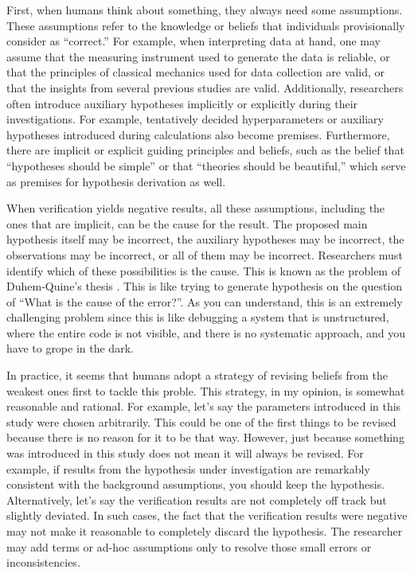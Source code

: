 \documentclass{article}
\begin{document}
First, when humans think about something, they always need some assumptions. These assumptions refer to the knowledge or beliefs that individuals provisionally consider as ``correct.'' For example, when interpreting data at hand, one may assume that the measuring instrument used to generate the data is reliable, or that the principles of classical mechanics used for data collection are valid, or that the insights from several previous studies are valid. Additionally, researchers often introduce auxiliary hypotheses implicitly or explicitly during their investigations. For example, tentatively decided hyperparameters or auxiliary hypotheses introduced during calculations also become premises. Furthermore, there are implicit or explicit guiding principles and beliefs, such as the belief that ``hypotheses should be simple'' or that ``theories should be beautiful,'' which serve as premises for hypothesis derivation as well.

When verification yields negative results, all these assumptions, including the ones that are implicit, can be the cause for the result. The proposed main hypothesis itself may be incorrect, the auxiliary hypotheses may be incorrect, the observations may be incorrect, or all of them may be incorrect. Researchers must identify which of these possibilities is the cause. This is known as the problem of Duhem-Quine's thesis \cite{sep-scientific-underdetermination}. This is like trying to generate hypothesis on the question of ``What is the cause of the error?''. As you can understand, this is an extremely challenging problem since this is like debugging a system that is unstructured, where the entire code is not visible, and there is no systematic approach, and you have to grope in the dark. 

In practice, it seems that humans adopt a strategy of revising beliefs from the weakest ones first to tackle this proble. This strategy, in my opinion, is somewhat reasonable and rational. For example, let's say the parameters introduced in this study were chosen arbitrarily. This could be one of the first things to be revised because there is no reason for it to be that way. However, just because something was introduced in this study does not mean it will always be revised. For example, if results from the hypothesis under investigation are remarkably consistent with the background assumptions, you should keep the hypothesis. Alternatively, let's say the verification results are not completely off track but slightly deviated. In such cases, the fact that the verification results were negative may not make it reasonable to completely discard the hypothesis. The researcher may add terms or ad-hoc assumptions only to resolve those small errors or inconsistencies.
\end{document}
